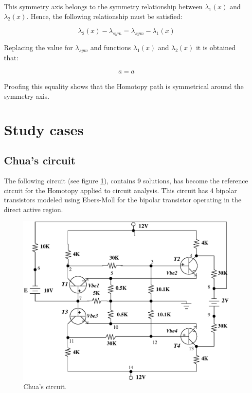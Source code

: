 \documentclass[conference,letterpaper,twocolumn]{IEEEtran}
\begin{document}
This symmetry axis belongs to the symmetry relationship between $\lambda_1(x)$ and $\lambda_2(x)$.
Hence, the following relationship must be satisfied:

\begin{displaymath}
\lambda_2(x)-\lambda_{sym}=\lambda_{sym} -\lambda_1(x)
\end{displaymath}

Replacing the value for $\lambda_{sym}$ and functions $\lambda_1(x)$ and $\lambda_2(x)$  it is obtained that:

\begin{displaymath}
\begin{array}{l}
a=a
\end{array}
\end{displaymath}

Proofing this equality shows that the Homotopy path is symmetrical around the symmetry axis.


\section{Study cases}


\subsection{Chua's circuit}

The following circuit \cite{homo_chua} (see figure \ref{newchua}), contains 9 solutions, has become the reference circuit for the Homotopy applied to circuit analysis. This circuit has 4 bipolar transistors modeled using Ebers-Moll for the bipolar transistor operating in the direct active region.




\begin{figure}[hbtp]
\centering
\includegraphics[scale=0.4]{fig/newchua.eps}
\caption{Chua's circuit.}
\label{newchua}
\end{figure}
\end{document}
